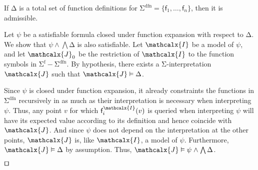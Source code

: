 \documentclass[runningheads,a4paper]{llncs}
\renewcommand\models{\mathrel{\vDash}}
\newcommand\DDD{\Delta}
\newcommand{\con}[1]{\mathsf{#1}}
\let\const=\con
\renewcommand\vec[1]{\overline{#1}}
\let\oldSigma=\Sigma
\def\Sigma{\mathrm{\oldSigma}}
\let\oldDelta=\Delta
\def\Delta{\mathrm{\oldDelta}}
\let\oldwedge=\wedge
\def\wedge{\mathrel{\oldwedge}}
\newcommand{\terms}{\mathcalx{T}}
\newcommand{\I}{\mathcalx{I}}
\newcommand{\J}{\mathcalx{J}}
\newcommand{\sfuns}[1]{#1^\mathrm{f}}
\newcommand{\sfundefs}[1]{#1^\mathrm{dfn}}
\renewcommand\qed{{\hfill$\squareforqed$}}
\begin{document}
\begin{theorem}
If
$\DDD$ is a total set of function definitions for
$\sfundefs{\Sigma} = \{\con{f}_1,\ldots,\con{f}_n\}$, then it is admissible.
\end{theorem}
\begin{proofsketch}
Let $\psi$ be a satisfiable formula closed under function expansion with
respect to $\DDD$. We show that $\psi \wedge \bigwedge \Delta$ is also
satisfiable. Let $\I$ be a model of $\psi$, and
let $\J_0$ be the restriction of $\I$ to the function symbols in $\sfuns{\Sigma} -
\sfundefs{\Sigma}$. By hypothesis, there exists a $\Sigma$-interpretation
$\J$ such that $\J \models \Delta$.

Since $\psi$ is closed under function expansion, it already constraints the
functions in $\sfundefs{\Sigma}$ recursively in as much as their interpretation
is necessary when interpreting $\psi$. Thus, any point $v$ for which
$\const{f}_i^\I(v)$ is queried when interpreting $\psi$ will have its
expected value according to its definition and hence coincide with $\J$.
And since $\psi$ does not depend on the interpretation at the other points,
$\J$ is, like $\I$, a model of $\psi$. Furthermore, $\J \models \Delta$ by
assumption. Thus, $\J \models \psi \wedge \bigwedge \Delta$.




\qed
\end{proofsketch}

\newpage
\end{document}
